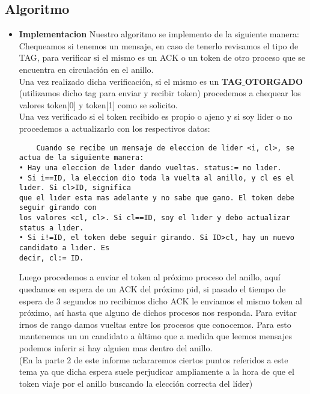 \subsection{Algoritmo}

\begin{itemize}
 \item \textbf{Implementacion}
Nuestro algoritmo se implemento de la siguiente manera:\\

Chequeamos si tenemos un mensaje, en caso de tenerlo revisamos el tipo de TAG, para verificar
si el mismo es un ACK o un token de otro proceso que se encuentra en circulación en el anillo.\\ Una vez realizado dicha verificación, si el mismo es un \textbf{TAG$\_$OTORGADO} (utilizamos dicho tag para enviar y recibir token) procedemos a chequear los valores token[0] y token[1] como se solicito.\\
Una vez verificado si el token recibido es propio o ajeno y si soy lider o no procedemos a actualizarlo con los respectivos datos:\\

\begin{verbatim}
	Cuando se recibe un mensaje de eleccion de lider <i, cl>, se actua de la siguiente manera:
• Hay una eleccion de lıder dando vueltas. status:= no lıder.
• Si i==ID, la eleccion dio toda la vuelta al anillo, y cl es el lıder. Si cl>ID, significa
que el lıder esta mas adelante y no sabe que gano. El token debe seguir girando con
los valores <cl, cl>. Si cl==ID, soy el lıder y debo actualizar status a lıder.
• Si i!=ID, el token debe seguir girando. Si ID>cl, hay un nuevo candidato a lıder. Es
decir, cl:= ID.
\end{verbatim}

Luego procedemos a enviar el token al próximo proceso del anillo, aquí quedamos en espera de un ACK del próximo pid, si pasado el tiempo de espera de 3 segundos no recibimos dicho ACK le enviamos el mismo token al próximo, así hasta que alguno de dichos procesos nos responda. Para evitar irnos de rango damos vueltas entre los procesos que conocemos. Para esto mantenemos un un candidato a ùltimo que a medida que leemos mensajes podemos inferir si hay alguien mas dentro del anillo.\\



(En la parte 2 de este informe aclararemos ciertos puntos referidos a este tema ya que dicha espera suele perjudicar ampliamente a la hora de que el token viaje por el anillo buscando la elección correcta del líder)\\


\end{itemize}
